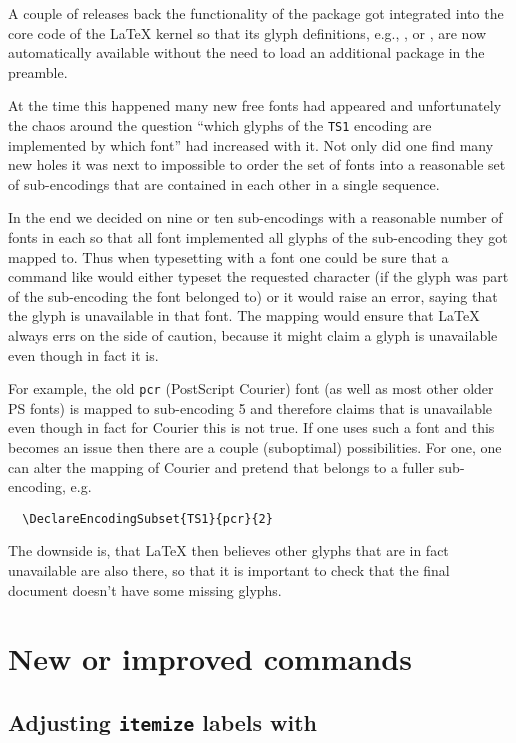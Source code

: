\documentclass{ltnews}
\providecommand\env[1]{\texttt{#1}}
\providecommand\env[1]{\texttt{#1}}
\begin{document}
A couple of releases back the functionality of the 
package got integrated into the core code of the \LaTeX{} kernel so
that its glyph definitions, e.g., ,  or
, are now automatically available without the need to load
an additional package in the preamble.

At the time this happened many new free fonts had appeared and
unfortunately the chaos around the question \enquote{which glyphs of
  the \texttt{TS1} encoding are implemented by which font} had
increased with it. Not only did one find many new holes it was next to
impossible to order the set of fonts into a reasonable set of
sub-encodings that are contained in each other in a single sequence.

In the end we decided on nine or ten sub-encodings with a reasonable
number of fonts %
in each so that all font implemented all glyphs of the
sub-encoding they got mapped to. Thus when typesetting with a font one
could be sure that a command like  would either
typeset the requested character (if the glyph was part of the
sub-encoding the font belonged to) or it would raise an error, saying
that the glyph is unavailable in that %
font.
The mapping would ensure
that \LaTeX{} always errs on the side of caution, because it might
claim a glyph is unavailable even though in fact it is.

For example, the old \texttt{pcr} (PostScript Courier) font (as well
as most other older PS fonts) is mapped to sub-encoding 5 and
therefore claims that  is unavailable even though
in fact for Courier this is not true. If one uses such a font and this
becomes an issue then there are a couple (suboptimal) possibilities.
For one, one can alter the mapping of Courier and pretend that belongs
to a fuller sub-encoding, e.g.
\begin{verbatim}
  \DeclareEncodingSubset{TS1}{pcr}{2}
\end{verbatim}
The downside is, that \LaTeX{} then believes other glyphs that are in fact
unavailable are also there, so that it is important to check that the
final document doesn't have some missing glyphs.


\section{New or improved commands}

\subsection{Adjusting \env{itemize} labels with }
\end{document}
